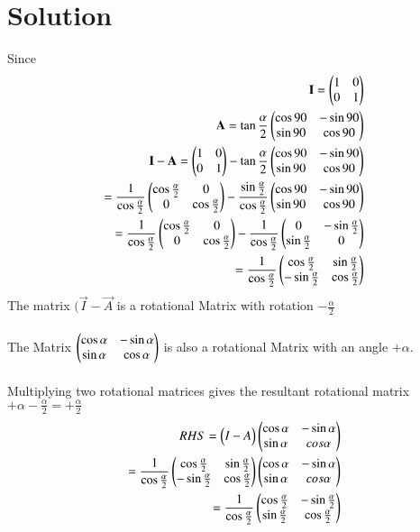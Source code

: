 \documentclass[journal,12pt,onecolumn]{IEEEtran}
\begin{document}
\section{\textbf{Solution}}
Since
\begin{align}
    \vec{I}=\myvec{1 & 0\\ 0 & 1}\\
    \vec{A}=\tan\frac{\alpha}{2}\myvec{\cos{90} & -\sin{90} \\ \sin{90} & \cos{90}}\\
\Vec{I}-\Vec{A}=\myvec{1 & 0\\ 0 & 1}-\tan\frac{\alpha}{2}\myvec{\cos{90} & -\sin{90} \\ \sin{90} & \cos{90}}\\
=\frac{1}{\cos\frac{\alpha}{2}}\myvec{\cos\frac{\alpha}{2} & 0 \\ 0 & \cos\frac{\alpha}{2}}-\frac{\sin\frac{\alpha}{2}}{\cos\frac{\alpha}{2}}\myvec{\cos{90} & -\sin{90} \\ \sin{90} & \cos{90}} \\
=\frac{1}{\cos\frac{\alpha}{2}}\myvec{\cos\frac{\alpha}{2} & 0 \\ 0 & \cos\frac{\alpha}{2}}-\frac{1}{\cos\frac{\alpha}{2}}\myvec{0 & -\sin\frac{\alpha}{2} \\ \sin\frac{\alpha}{2} & 0} \\
=\frac{1}{\cos\frac{\alpha}{2}}\myvec{\cos\frac{\alpha}{2} & \sin\frac{\alpha}{2} \\ -\sin\frac{\alpha}{2} & \cos\frac{\alpha}{2}}
\end{align}
The matrix $(\vec{I}-\vec{A}$ is a rotational Matrix with rotation $-\frac{\alpha}{2}$ \\\\
The Matrix $\begin{pmatrix}\cos\alpha & -\sin\alpha \\ \sin\alpha & \cos\alpha\end{pmatrix}$ is also a rotational Matrix with an angle $+\alpha$.\\\\
Multiplying two rotational matrices gives the resultant rotational matrix $+\alpha-\frac{\alpha}{2}=+\frac{\alpha}{2}$\\
\begin{align}
  RHS=\begin{pmatrix}I-A\end{pmatrix}\begin{pmatrix}\cos\alpha & -\sin\alpha \\ \sin\alpha & cos\alpha\end{pmatrix}\\
 =\frac{1}{\cos\frac{\alpha}{2}}\begin{pmatrix}\cos\frac{\alpha}{2} & \sin\frac{\alpha}{2} \\ -\sin\frac{\alpha}{2} & \cos\frac{\alpha}{2}\end{pmatrix}\begin{pmatrix}\cos\alpha & -\sin\alpha \\ \sin\alpha & cos\alpha\end{pmatrix}\\
   =\frac{1}{\cos\frac{\alpha}{2}}\begin{pmatrix}\cos\frac{\alpha}{2} & -\sin\frac{\alpha}{2} \\ \sin\frac{\alpha}{2} & \cos\frac{\alpha}{2}\end{pmatrix}\\
\end{align}
\end{document}
